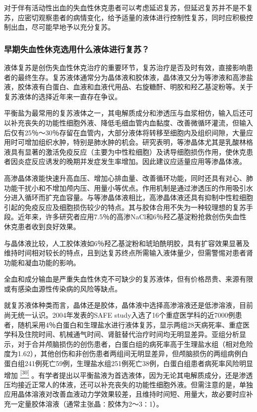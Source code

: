 对于伴有活动性出血的失血性休克患者可以考虑延迟复苏，但延迟复苏并不是不复苏，应密切观察患者的病情变化，给予适量的液体进行控制性复苏，同时应积极控制出血，尽可能早地予以充分复苏。

\subsubsection{早期失血性休克选用什么液体进行复苏？}

液体复苏是创伤失血性休克治疗的重要环节，复苏治疗是否及时有效，直接影响患者的最终生存。复苏液体通常分为晶体液和胶体液，晶体液又分为等渗液和高渗盐液，胶体液有白蛋白、血液和血液代用品、右旋糖酐、明胶和羟乙基淀粉等。关于复苏液体的选择近年来一直存在争议。

平衡盐为最常用的复苏液体之一，其电解质成分和渗透压与血浆相仿，输入后还可以补充丧失的功能性细胞外液、降低毛细血管内血黏度、改善微循环灌流，但输入后仅有25％～30％存留在血管内，大部分液体将转移至细胞内及组织间隙，大量应用时可增加组织水肿，特别是肺水肿的机会。研究表明，等渗晶体尤其是乳酸林格液具有显著的激活免疫反应（主要为中性粒细胞）及诱导细胞损伤作用，使休克患者因炎症反应诱发的晚期并发症发生率增加。因此建议应适量应用等渗晶体液。

高渗晶体液能快速升高血压、增加心排血量、改善循环功能，同时还具有对心、肺功能干扰小和不增加颅内压、用量小等优点。作用机制是通过渗透压的作用吸引水分进入循环而扩充血容量。与等渗晶体液相比，高渗晶体液还具有抑制中性粒细胞引起的免疫反应及细胞损伤较少的特点。其与胶体合用不失为一种较理想的复苏手段。近年来，许多研究者应用7.5％的高渗NaCl和6％羟乙基淀粉抢救创伤失血性休克患者收到良好效果。

与晶体液比较，人工胶体液如6％羟乙基淀粉和琥珀酰明胶，具有扩容效果显著及维持时间相对较长的特点，且到达复苏终点所需输入液体量少，但需警惕对患者肾功能和凝血功能的影响。

全血和成分输血是严重失血性休克不可缺少的复苏液体，但有价格昂贵、来源有限或有感染血源性传染病的风险等缺点。

就复苏液体种类而言，晶体还是胶体，晶体液中选择高渗溶液还是低渗溶液，目前尚无统一认识。2004年发表的SAFE
study入选了16个重症医学科的近7000例患者，随机采用4％白蛋白和生理盐水进行液体复苏，显示两组28天病死率、重症医学科及住院时间、机械通气时间、肾脏替代治疗时间均无明显差异。亚组分析显示，对于合并颅脑损伤的创伤患者，白蛋白组的病死率高于生理盐水组（相对危险度为1.62），其他创伤和非创伤患者两组间无明显差异，但颅脑损伤的两组病例白蛋白组241例死亡59例，生理盐水组251例死亡38例，白蛋白组患者病死率风险明显增加
\protect\hyperlink{text00024.htmlux5cux23ch30-23}{\textsuperscript{{[}30{]}}}
。有学者提出以平衡盐液为首选液体，因为无论其电解质成分，还是渗透压均接近正常人的体液，还可以补充丧失的功能性细胞外液。但需注意的是，单独应用晶体溶液对改善血液动力学效果较差，且维持时间短、用量大，故必要时应补充一定量胶体溶液（通常主张晶∶胶体为2～3∶1）。

